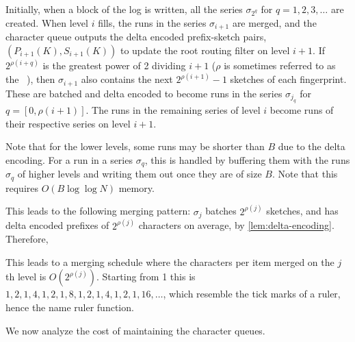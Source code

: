 Initially, when a block of the log is written, all the series $\sigma_{2^q}$
for $q=1,2,3,\ldots$ are created. When level $i$ fills, the runs in the series
$\sigma_{i+1}$ are merged, and the character queue outputs the delta encoded
prefix-sketch pairs, $(P_{i+1}(K),S_{i+1}(K))$ to update the root routing
filter on level $i+1$. If $2^{\rho(i+q)}$ is the greatest power of 2 dividing
$i+1$ ($\rho$ is sometimes referred to as the ~\cite{wiki:Thomae's_function}), then $\sigma_{i+1}$ also contains the
next $2^{\rho(i+1)}-1$ sketches of each fingerprint. These are batched and
delta encoded to become runs in the series $\sigma_{j_q}$ for $q =
[0,\rho(i+1)]$. The runs in the remaining series of level $i$ become runs of
their respective series on level $i+1$.

Note that for the lower levels, some runs may be shorter than $B$ due to the
delta encoding. For a run in a series $\sigma_q$, this is handled by buffering
them with the runs $\sigma_q$ of higher levels and writing them out once they
are of size $B$. Note that this requires $O(B\log\log N)$ memory.

This leads to the following merging pattern: $\sigma_j$ batches $2^{\rho(j)}$
sketches, and has delta encoded prefixes of $2^{\rho(j)}$ characters on average,
by \cref{lem:delta-encoding}. Therefore,


This leads to a merging schedule where the characters per item merged on the
$j$th level is $O(2^{\rho(j)})$. Starting from 1 this is
$1,2,1,4,1,2,1,8,1,2,1,4,1,2,1,16,\ldots$, which resemble the tick marks of a
ruler, hence the name ruler function.

We now analyze the cost of maintaining the character queues.


